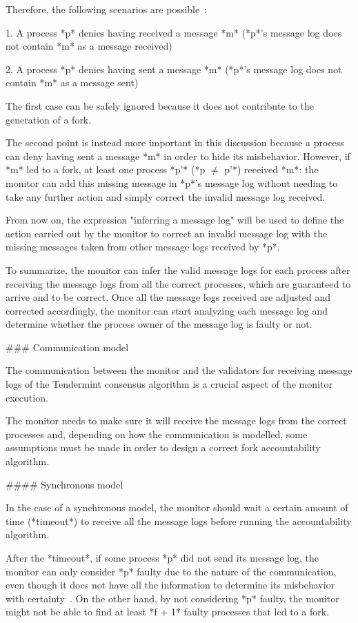 \documentclass[a4paper,11pt,oneside]{report}
\begin{document}
\begin{markdown}
Therefore, the following scenarios are possible~\cite{fork-accountability-specs}:
 
1. A process *p* denies having received a message *m* (*p*'s message log does not contain *m* as a message received)  

2. A process *p* denies having sent a message *m* (*p*'s message log does not contain *m* as a message sent) 

The first case can be safely ignored because it does not contribute to the generation of a fork.

The second point is instead more important in this discussion because a process can deny having sent a message *m* in order to hide its misbehavior. 
However, if *m* led to a fork, at least one process *p'* (*p $\neq$ p'*) received *m*: the monitor can add this missing message in *p*'s message log without needing to take any further action and simply correct the invalid message log received. 

From now on, the expression "inferring a message log" will be used to define the action carried out by the monitor to correct an invalid message log with the missing messages taken from other message logs received by *p*.

To summarize, the monitor can infer the valid message logs for each process after receiving the message logs from all the correct processes, which are guaranteed to arrive and to be correct.
Once all the message logs received are adjusted and corrected accordingly, the monitor can start analyzing each message log and determine whether the process owner of the message log is faulty or not.

### Communication model

The communication between the monitor and the validators for receiving message logs of the Tendermint consensus algorithm is a crucial aspect of the monitor execution.

The monitor needs to make sure it will receive the message logs from the correct processes and, depending on how the communication is modelled, some assumptions must be made in order to design a correct fork accountability algorithm.

#### Synchronous model

In the case of a synchronous model, the monitor should wait a certain amount of time (*timeout*) to receive all the message logs before running the accountability algorithm.

After the *timeout*, if some process *p* did not send its message log, the monitor can only consider *p* faulty due to the nature of the communication, even though it does not have all the information to determine its misbehavior with certainty~\cite{fork-accountability-specs}. 
On the other hand, by not considering *p* faulty, the monitor might not be able to find at least *f + 1* faulty processes that led to a fork.


\end{markdown}
\end{document}

